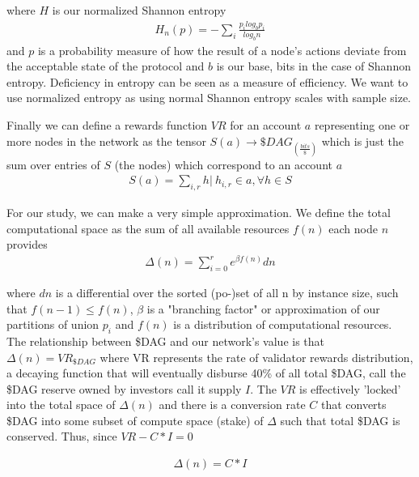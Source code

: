 \documentclass{article}
\begin{document}
where $H$ is our normalized Shannon entropy
\begin{equation*} \label{eq1}
\begin{split}
H_n(p) = - \sum_i \frac{p_i log_b p_i}{log_b n}
\end{split}
\end{equation*}
and $p$ is a probability measure of how the result of a node's actions deviate from the acceptable state of the protocol and $b$ is our base, bits in the case of Shannon entropy. Deficiency in entropy can be seen as a measure of efficiency. We want to use normalized entropy as using normal Shannon entropy scales with sample size.

Finally we can define a rewards function $VR$ for an account $a$ representing one or more nodes in the network as the tensor $S(a) \rightarrow \$DAG_{(\frac{bits}{\$})}$ which is just the sum over entries of $S$ (the nodes) which correspond to an account $a$
\begin{equation*} \label{eq1}
\begin{split}
S(a) = \sum_{i, r} h | \ h_{i, r} \in a,  \forall h \in S
\end{split}
\end{equation*}

For our study, we can make a very simple approximation. We define the total computational space as the sum of all available resources $f(n)$ each node $n$ provides
\begin{equation*} \label{eq1}
\begin{split}
\Delta(n) = \sum_{i=0}^r e^{\beta f(n)} dn
\end{split}
\end{equation*}

where $dn$ is a differential over the sorted (po-)set of all n by instance size, such that $f(n-1) \leq f(n)$, $\beta$ is a "branching factor" or approximation of our partitions of union $p_i$ and $f(n)$ is a distribution of computational resources. The relationship between \$DAG and our network's value is that $\Delta(n) = VR_{\$DAG}$ where VR represents the rate of validator rewards distribution, a decaying function that will eventually disburse 40\% of all total \$DAG, call the \$DAG reserve owned by investors call it supply $I$. The $VR$ is effectively 'locked' into the total space of $\Delta(n)$ and there is a conversion rate $C$ that converts \$DAG into some subset of compute space (stake) of $\Delta$ such that total \$DAG is conserved. Thus, since $VR - C*I = 0$ 

\begin{equation*} \label{eq1}
\begin{split}
\Delta(n) = C* I
\end{split}
\end{equation*}
\end{document}

